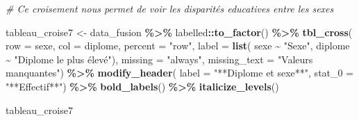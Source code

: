 \documentclass[
]{article}
\newenvironment{Shaded}{\begin{snugshade}}{\end{snugshade}}
\newcommand{\AttributeTok}[1]{\textcolor[rgb]{0.13,0.29,0.53}{#1}}
\newcommand{\CommentTok}[1]{\textcolor[rgb]{0.56,0.35,0.01}{\textit{#1}}}
\newcommand{\FunctionTok}[1]{\textcolor[rgb]{0.13,0.29,0.53}{\textbf{#1}}}
\newcommand{\NormalTok}[1]{#1}
\newcommand{\OtherTok}[1]{\textcolor[rgb]{0.56,0.35,0.01}{#1}}
\newcommand{\SpecialCharTok}[1]{\textcolor[rgb]{0.81,0.36,0.00}{\textbf{#1}}}
\newcommand{\StringTok}[1]{\textcolor[rgb]{0.31,0.60,0.02}{#1}}
\begin{document}
\begin{Shaded}
\begin{Highlighting}[]
\CommentTok{\# Ce croisement nous permet de voir les  disparités educatives entre les sexes}

\NormalTok{tableau\_croise7 }\OtherTok{\textless{}{-}}\NormalTok{ data\_fusion }\SpecialCharTok{\%\textgreater{}\%}
\NormalTok{  labelled}\SpecialCharTok{::}\FunctionTok{to\_factor}\NormalTok{() }\SpecialCharTok{\%\textgreater{}\%}  
  \FunctionTok{tbl\_cross}\NormalTok{(}
    \AttributeTok{row =}\NormalTok{ sexe,  }
    \AttributeTok{col =}\NormalTok{ diplome,  }
    \AttributeTok{percent =} \StringTok{"row"}\NormalTok{,  }
    \AttributeTok{label =} \FunctionTok{list}\NormalTok{(}
\NormalTok{      sexe }\SpecialCharTok{\textasciitilde{}} \StringTok{"Sexe"}\NormalTok{,  }
\NormalTok{      diplome }\SpecialCharTok{\textasciitilde{}} \StringTok{"Diplome le plus élevé"}\NormalTok{),}
    \AttributeTok{missing =} \StringTok{"always"}\NormalTok{,  }
    \AttributeTok{missing\_text =} \StringTok{"Valeurs manquantes"}\NormalTok{) }\SpecialCharTok{\%\textgreater{}\%}
  \FunctionTok{modify\_header}\NormalTok{(}
    \AttributeTok{label =} \StringTok{"**Diplome et sexe**"}\NormalTok{,}
    \AttributeTok{stat\_0 =} \StringTok{"**Effectif**"}\NormalTok{) }\SpecialCharTok{\%\textgreater{}\%}
  \FunctionTok{bold\_labels}\NormalTok{() }\SpecialCharTok{\%\textgreater{}\%}  
  \FunctionTok{italicize\_levels}\NormalTok{()}

\NormalTok{tableau\_croise7}
\end{Highlighting}
\end{Shaded}
\end{document}
